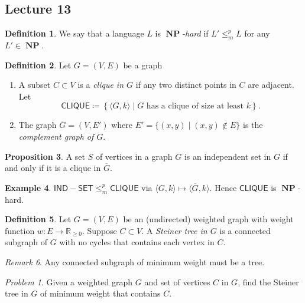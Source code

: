 \documentclass[10pt,letterpaper,cm]{nupset}
\theoremstyle{definition}
\newtheorem{definition}{Definition}[subsection]
\newtheorem{exmp}[definition]{Example}
\theoremstyle{theorem}
\newtheorem{prop}[definition]{Proposition}
\theoremstyle{remark}
\newtheorem{remark}[definition]{Remark}
\newtheorem*{prob}{Problem}
\newcommand{\R}{\mathbb R}
\newcommand{\1}{\mathbf{1}}
\newcommand{\0}{\vec 0}
\DeclareMathOperator{\NP}{\mathbf{NP}}
\begin{document}
\subsection{Lecture 13}

\begin{definition}
We say that a language $L$ is \textit{$\NP$-hard} if $L' \leq_m^p L$ for any $L' \in \NP$.
\end{definition}

\begin{definition} Let $G=\left(V, E\right)$ be a graph
\begin{enumerate}
\item A subset $C \subset V$ is a \textit{clique in $G$} if any two distinct points in $C$ are adjacent. Let $$\mathsf{CLIQUE}\coloneqq \left\{\langle G, k \rangle \mid G \text{ has a clique of size at least }k\right\}.$$
\item The graph $\overline{G} = (V, E')$ where $E' = \{(x,y) \mid (x,y) \notin E\}$ is the  \textit{complement graph of $G$}.
\end{enumerate}
\end{definition}

\begin{prop}
 A set $S$ of vertices in a graph $G$ is an independent set in $G$ if and only if it is a clique in $\overline{G}$.
\end{prop}

\begin{exmp}
$\mathsf{IND{-}SET} \leq_m^p \mathsf{CLIQUE}$ via $\langle G, k \rangle \mapsto \langle \overline{G}, k \rangle$. Hence $\mathsf{CLIQUE}$ is $\NP$-hard.
\end{exmp}

\begin{definition}
Let $G= \left(V, E\right)$ be an (undirected) weighted graph with weight function $w : E \to \R_{\geq 0}$. Suppose $C \subset V$. A \textit{Steiner tree in $G$} is a connected subgraph of $G$ with no cycles that contains each vertex in $C$.
\end{definition}

\begin{remark}
Any connected subgraph of minimum weight must be a tree.
\end{remark}

\begin{prob}
Given a weighted graph $G$ and set of vertices $C$ in $G$, find the Steiner tree in $G$ of minimum weight that contains $C$.
\end{prob}
\end{document}
